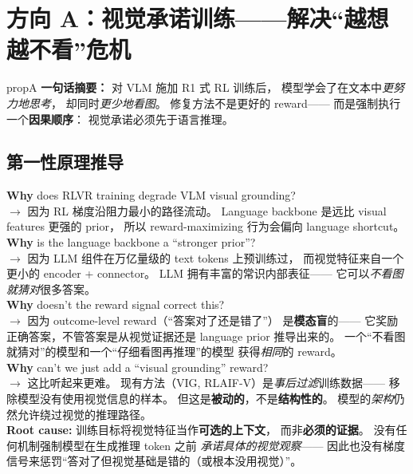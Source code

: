 \documentclass[12pt,a4paper]{article}
\begin{document}
\newpage
\section{方向 A：视觉承诺训练——解决``越想越不看''危机}
\label{sec:propA}

\begin{proposalbox}{propA}
\textbf{一句话摘要：}
对 VLM 施加 R1 式 RL 训练后，
模型学会了在文本中\textit{更努力地思考}，
却同时\textit{更少地看图}。
修复方法不是更好的 reward——
而是强制执行一个\textbf{因果顺序}：
视觉承诺必须先于语言推理。
\end{proposalbox}

\subsection{第一性原理推导}

\begin{whybox}
\textbf{Why} does RLVR training degrade VLM visual grounding?\\
$\rightarrow$ 因为 RL 梯度沿阻力最小的路径流动。
Language backbone 是远比 visual features 更强的 prior，
所以 reward-maximizing 行为会偏向 language shortcut。\\[3pt]
\textbf{Why} is the language backbone a ``stronger prior''?\\
$\rightarrow$ 因为 LLM 组件在万亿量级的 text tokens 上预训练过，
而视觉特征来自一个更小的 encoder + connector。
LLM 拥有丰富的常识内部表征——
它可以\textit{不看图就猜对}很多答案。\\[3pt]
\textbf{Why} doesn't the reward signal correct this?\\
$\rightarrow$ 因为 outcome-level reward（``答案对了还是错了''）
是\textbf{模态盲}的——
它奖励正确答案，不管答案是从视觉证据还是 language prior 推导出来的。
一个``不看图就猜对''的模型和一个``仔细看图再推理''的模型
获得\textit{相同}的 reward。\\[3pt]
\textbf{Why} can't we just add a ``visual grounding'' reward?\\
$\rightarrow$ 这比听起来更难。
现有方法（VIG, RLAIF-V）是\textit{事后过滤}训练数据——
移除模型没有使用视觉信息的样本。
但这是\textbf{被动的}，不是\textbf{结构性的}。
模型的\textit{架构}仍然允许绕过视觉的推理路径。\\[3pt]
\textbf{Root cause:}
训练目标将视觉特征当作\textbf{可选的上下文}，
而非\textbf{必须的证据}。
没有任何机制强制模型在生成推理 token 之前
\textit{承诺具体的视觉观察}——
因此也没有梯度信号来惩罚``答对了但视觉基础是错的（或根本没用视觉）''。
\end{whybox}
\end{document}
